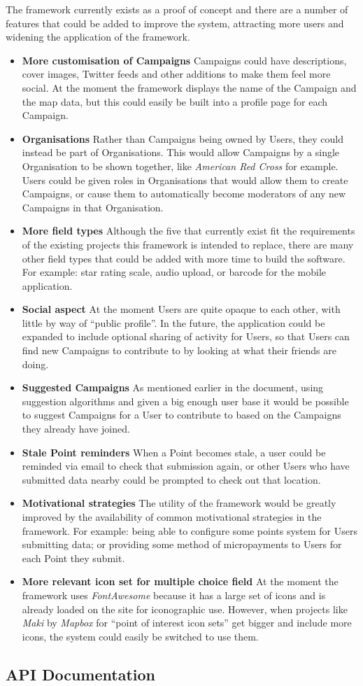 \documentclass{article}
\let\oldsection\section
\renewcommand\section{\clearpage\oldsection}
\newcommand{\pitem}[1]{
	\item{\textbf{#1}}
}
\begin{document}
		The framework currently exists as a proof of concept and there are a number of features that could be added to improve the system, attracting more users and widening the application of the framework.

		\begin{itemize}
			\pitem{More customisation of Campaigns} Campaigns could have descriptions, cover images, Twitter feeds and other additions to make them feel more social. At the moment the framework displays the name of the Campaign and the map data, but this could easily be built into a profile page for each Campaign.
			\pitem{Organisations} Rather than Campaigns being owned by Users, they could instead be part of Organisations. This would allow Campaigns by a single Organisation to be shown together, like \emph{American Red Cross} for example. Users could be given roles in Organisations that would allow them to create Campaigns, or cause them to automatically become moderators of any new Campaigns in that Organisation.
			\pitem{More field types} Although the five that currently exist fit the requirements of the existing projects this framework is intended to replace, there are many other field types that could be added with more time to build the software. For example: star rating scale, audio upload, or barcode for the mobile application.
			\pitem{Social aspect} At the moment Users are quite opaque to each other, with little by way of ``public profile''. In the future, the application could be expanded to include optional sharing of activity for Users, so that Users can find new Campaigns to contribute to by looking at what their friends are doing.
			\pitem{Suggested Campaigns} As mentioned earlier in the document, using suggestion algorithms and given a big enough user base it would be possible to suggest Campaigns for a User to contribute to based on the Campaigns they already have joined.
			\pitem{Stale Point reminders} When a Point becomes stale, a user could be reminded via email to check that submission again, or other Users who have submitted data nearby could be prompted to check out that location.
			\pitem{Motivational strategies} The utility of the framework would be greatly improved by the availability of common motivational strategies in the framework. For example: being able to configure some points system for Users submitting data; or providing some method of micropayments to Users for each Point they submit.
			\pitem{More relevant icon set for multiple choice field} At the moment the framework uses \emph{FontAwesome} because it has a large set of icons and is already loaded on the site for iconographic use. However, when projects like \emph{Maki} by \emph{Mapbox} for ``point of interest icon sets'' get bigger and include more icons, the system could easily be switched to use them.
		\end{itemize}

	
	

	\clearpage
	\begin{appendices}
	\oldsection{API Documentation}
	\label{sec:api-docs}
	\end{appendices}
\end{document}
